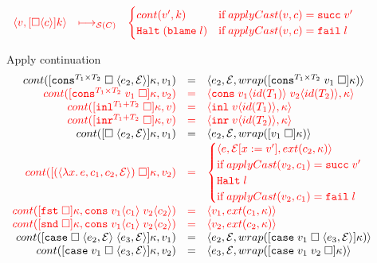 \documentclass[acmsmall,review]{acmart}\settopmatter{printfolios=true,printccs=false,printacmref=false}
\newcommand{\funrule}[3]{#1 &=& #2 & #3\\}
\newcommand{\hifunrule}[3]{\highlight{#1} &\highlight{=}& \highlight{#2} & 
\highlight{#3}\\}
\newcommand{\plus}[0]{+}
\newcommand{\sOOinspect}[3]{\langle#1,#2,#3\rangle}
\newcommand{\sOOreturn}[2]{\langle#1,#2\rangle}
\newcommand{\sOOhalt}[1]{\mathtt{Halt} \; #1}
\newcommand{\POOprod}[2]{#1 \times #2}
\newcommand{\POOsum}[2]{#1 \plus #2}
\newcommand{\oOOblame}[1]{\mathtt{blame} \; #1}
\newcommand{\rOOsucc}[1]{\mathtt{succ}\;#1}
\newcommand{\rOOfail}[1]{\mathtt{fail}\;#1}
\newcommand{\kOOconsI}[5]{
	[\mathtt{cons}^{\POOprod{#1}{#2}} \; \square \; \langle#3,#4\rangle ]#5}
\newcommand{\kOOconsII}[4]{
	[\mathtt{cons}^{\POOprod{#1}{#2}} \; #3 \; \square]#4}
\newcommand{\kOOinl}[3]{[\mathtt{inl}^{\POOsum{#1}{#2}}\; \square]#3}
\newcommand{\kOOinr}[3]{[\mathtt{inr}^{\POOsum{#1}{#2}}\; \square]#3}
\newcommand{\kOOappI}[3]{
  [\square \; \langle#1,#2\rangle]#3
}
\newcommand{\kOOappII}[2]{
  [#1 \; \square]#2}
\newcommand{\kOOcar}[1]{[\mathtt{fst} \; \square]#1}
\newcommand{\kOOcdr}[1]{[\mathtt{snd} \; \square]#1}
\newcommand{\kOOcaseI}[4]{
  [\mathtt{case} \; \square \; \langle#1,#3\rangle \; \langle#2,#3\rangle ]#4}
\newcommand{\kOOcaseII}[4]{
  [\mathtt{case} \; #1 \; \square \; \langle#2,#3\rangle ]#4}
\newcommand{\kOOcaseIII}[3]{
  [\mathtt{case} \; #1 \; #2 \; \square]#3}
\newcommand{\kOOcast}[2]{
  [\square \langle #1 \rangle]#2}
\newcommand{\hcvOOfun}[5]{\langle \lambda #3.\, #4 , #1 , #5, #2 \rangle}
\newcommand{\hcvOOcons}[4]{\mathtt{cons}\;#1\langle#2\rangle\;#3\langle#4\rangle}
\newcommand{\hcvOOinl}[2]{\mathtt{inl}\;#1\langle#2\rangle}
\newcommand{\hcvOOinr}[2]{\mathtt{inr}\;#1\langle#2\rangle}
\newcommand{\sidecond}[1]{\text{if}\;#1}
\newcommand{\hiredruleS}[3]{\highlight{#1} & 
\highlight{\longmapsto_{\mathcal{S}(C)}} & \highlight{#2} & \highlight{#3} \\}
\newcommand{\continue}[2]{cont(#2,#1)}
\newcommand{\highlight}[1]{{\color{red} #1}}
\begin{document}
\begin{figure}
\[\begin{array}{rclr}
  \hiredruleS{
    \sOOreturn{v}{\kOOcast{c}{k}}
  }{
  \begin{cases}
  \continue{k}{v'} & \sidecond{applyCast(v,c) = \rOOsucc{v'}} 
  \\
  \sOOhalt{(\oOOblame{l})} & \sidecond{applyCast(v,c) = \rOOfail{l}}
  \end{cases}
  }{}
  \end{array}
  \]
  
  Apply continuation
  \fbox{$\continue{v}{k} = s$}
  \[
  \begin{array}{rclr}
  

\funrule{
  \continue{v_1}{\kOOconsI{T_1}{T_2}{e_2}{\mathcal{E}}{\kappa}}}{
  \sOOinspect{e_2}{\mathcal{E}}{wrap(\kOOconsII{T_1}{T_2}{v_1}{\kappa})}}{}

\hifunrule{
  \continue{v_2}{\kOOconsII{T_1}{T_2}{v_1}{\kappa}}}{
  \sOOreturn{\hcvOOcons{v_1}{id(T_1)}{v_2}{id(T_2)}}{\kappa}}{}

\hifunrule{
  \continue{v}{\kOOinl{T_1}{T_2}{\kappa}}}{
  \sOOreturn{\hcvOOinl{v}{id(T_1)}}{\kappa}}{}

\hifunrule{
  \continue{v}{\kOOinr{T_1}{T_2}{\kappa}}}{
  \sOOreturn{\hcvOOinr{v}{id(T_2)}}{\kappa}}{}

\funrule{
  \continue{v_1}{\kOOappI{e_2}{\mathcal{E}}{\kappa}}}{
  \sOOinspect{e_2}{\mathcal{E}}{
    wrap(\kOOappII{v_1}{\kappa})
  }}{}

\hifunrule{
  \continue{v_2}{\kOOappII{(\hcvOOfun{c_1}{\mathcal{E}}{x}{e}{c_2})}{\kappa}}}{
\begin{cases}
\sOOinspect{e}{\mathcal{E}[x:=v']}{ext(c_2,\kappa)} \\
\sidecond{applyCast(v_2,c_1) = \rOOsucc{v'}}
\\
\sOOhalt{l} \\
\sidecond{applyCast(v_2,c_1) = \rOOfail{l}}
\end{cases}
}{}


\hifunrule{
  \continue{\hcvOOcons{v_1}{c_1}{v_2}{c_2}}{
    \kOOcar{\kappa}
  }
}{
  \sOOreturn{v_1}{ext(c_1,\kappa)}
}{}
\hifunrule{
  \continue{\hcvOOcons{v_1}{c_1}{v_2}{c_2}}{
    \kOOcdr{\kappa}
  }
}{
  \sOOreturn{v_2}{ext(c_2,\kappa)}
}{}

\funrule{
  \continue{v_1}{\kOOcaseI{e_2}{e_3}{\mathcal{E}}{\kappa}}
}{
  \sOOinspect{e_2}{\mathcal{E}}{
    wrap(\kOOcaseII{v_1}{e_3}{\mathcal{E}}{\kappa})
  }
}{}

\funrule{
  \continue{v_2}{
    \kOOcaseII{v_1}{e_3}{\mathcal{E}}{\kappa}
  }
}{
  \sOOinspect{e_3}{\mathcal{E}}{
  wrap(\kOOcaseIII{v_1}{v_2}{\kappa})
  }
}{}


\end{array}\]
\end{figure}
\end{document}

